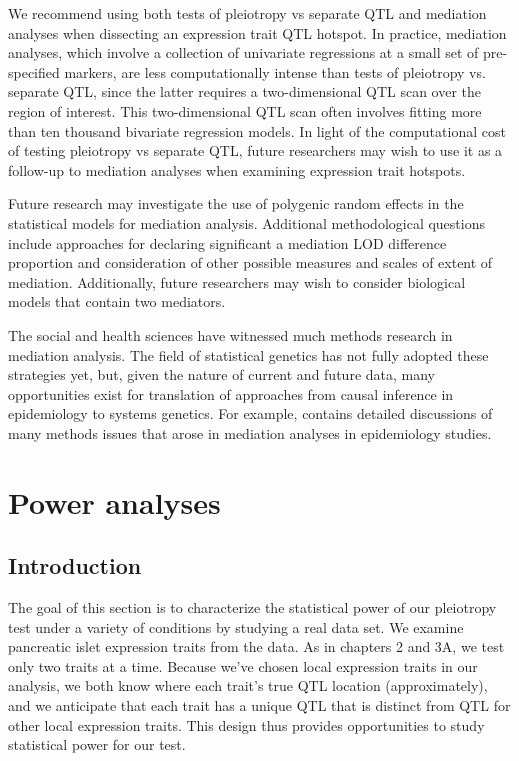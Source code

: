 \documentclass[oneside]{book}
\begin{document}
We recommend using both tests of pleiotropy vs separate QTL and mediation analyses when dissecting an expression trait QTL hotspot. In practice, mediation analyses, which involve a collection of univariate regressions at a small set of pre-specified markers, are less computationally intense than tests of pleiotropy vs. separate QTL, since the latter requires a two-dimensional QTL scan over the region of interest. This two-dimensional QTL scan often involves fitting more than ten thousand bivariate regression models. In light of the computational cost of testing pleiotropy vs separate QTL, future researchers may wish to use it as a follow-up to mediation analyses when examining expression trait hotspots.

Future research may investigate the use of polygenic random effects in the statistical models for mediation analysis. Additional methodological questions include approaches for declaring significant a mediation LOD difference proportion and consideration of other possible measures and scales of extent of mediation. Additionally, future researchers may wish to consider biological models that contain two mediators.

The social and health sciences have witnessed much methods research in mediation analysis. The field of statistical genetics has not fully adopted these strategies yet, but, given the nature of current and future data, many opportunities exist for translation of approaches from causal inference in epidemiology to systems genetics. For example, \citet{vanderweele2015explanation} contains detailed discussions of many methods issues that arose in mediation analyses in epidemiology studies.




\section{Power analyses}

\subsection{Introduction}

The goal of this section is to characterize the statistical power of our pleiotropy test under a variety of conditions by studying a real data set. We examine pancreatic islet expression traits from the \citet{keller2018genetic} data. As in chapters 2 and 3A, we test only two traits at a time. Because we’ve chosen local expression traits in our analysis, we both know where each trait’s true QTL location (approximately), and we anticipate that each trait has a unique QTL that is distinct from QTL for other local expression traits. This design thus provides opportunities to study statistical power for our test.
\end{document}
